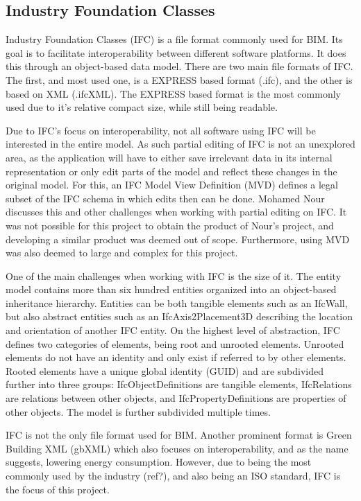 \subsection{Industry Foundation Classes}
Industry Foundation Classes (IFC) is a file format commonly used for BIM. Its goal is to facilitate interoperability between different software platforms. It does this through an object-based data model. There are two main file formats of IFC. The first, and most used one, is a EXPRESS based format (.ifc), and the other is based on XML (.ifcXML). The EXPRESS based format is the most commonly used due to it's relative compact size, while still being readable. 

Due to IFC's focus on interoperability, not all software using IFC will be interested in the entire model. As such partial editing of IFC is not an unexplored area, as the application will have to either save irrelevant data in its internal representation or only edit parts of the model and reflect these changes in the original model. For this, an IFC Model View Definition (MVD) defines a legal subset of the IFC schema\cite{mvd} in which edits then can be done. Mohamed Nour discusses this and other challenges when working with partial editing on IFC\cite{nour08}. It was not possible for this project to obtain the product of Nour's project, and developing a similar product was deemed out of scope. Furthermore, using MVD was also deemed to large and complex for this project.

One of the main challenges when working with IFC is the size of it. The entity model contains more than six hundred entities organized into an object-based inheritance hierarchy. Entities can be both tangible elements such as an IfcWall, but also abstract entities such as an IfcAxis2Placement3D describing the location and orientation of another IFC entity. On the highest level of abstraction, IFC defines two categories of elements, being root and unrooted elements. Unrooted elements do not have an identity and only exist if referred to by other elements. Rooted elements have a unique global identity (GUID) and are subdivided further into three groups: IfcObjectDefinitions are tangible elements, IfcRelations are relations between other objects, and IfcPropertyDefinitions are properties of other objects. The model is further subdivided multiple times. 

IFC is not the only file format used for BIM. Another prominent format is Green Building XML (gbXML) which also focuses on interoperability, and as the name suggests, lowering energy consumption. However, due to being the most commonly used by the industry (ref?), and also being an ISO standard, IFC is the focus of this project.
